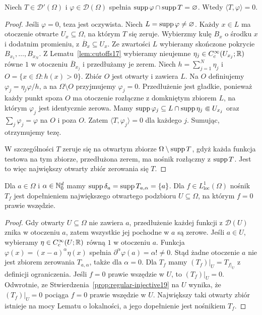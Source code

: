 \begin{lemat}
\label{lem:distribution-local19}
Niech $T\in\mathcal D'(\Omega)$ i
$\varphi\in\mathcal D(\Omega)$ spełnia
$\operatorname{supp}\varphi\cap\operatorname{supp} T=\varnothing$. Wtedy
$\langle T,\varphi\rangle=0$.
\end{lemat}
\begin{proof}
Jeśli $\varphi=0$, teza jest oczywista.
Niech $L=\operatorname{supp}\varphi\ne\varnothing$.
Każdy $x\in L$ ma otoczenie otwarte $U_x\subseteq\Omega$,
na którym $T$ się zeruje. Wybierzmy kulę $B_x$
o środku $x$ i dodatnim promieniu, z $\overline B_x\subseteq U_x$.
Ze zwartości $L$ wybieramy skończone pokrycie
$B_{x_1},\ldots,B_{x_N}$.
Z Lematu~\ref{lem:cutoffs17} wybieramy nieujemne
$\eta_j\in C_c^\infty(U_{x_j};\mathbb R)$ równe $1$
w otoczeniu $\overline B_{x_j}$ i przedłużamy je zerem.
Niech $h=\sum_{j=1}^N\eta_j$ i $O=\{x\in\Omega:h(x)>0\}$.
Zbiór $O$ jest otwarty i zawiera $L$.
Na $O$ definiujemy $\varphi_j=\eta_j\varphi/h$,
a na $\Omega\setminus O$ przyjmujemy $\varphi_j=0$.
Przedłużenie jest gładkie, ponieważ każdy punkt spoza $O$
ma otoczenie rozłączne z domkniętym zbiorem $L$,
na którym $\varphi_j$ jest identycznie zerowa.
Mamy $\operatorname{supp}\varphi_j\subseteq L\cap\operatorname{supp}\eta_j\Subset U_{x_j}$
oraz $\sum_j\varphi_j=\varphi$ na $O$ i poza $O$.
Zatem $\langle T,\varphi_j\rangle=0$ dla każdego $j$.
Sumując, otrzymujemy tezę.

W szczególności $T$ zeruje się na otwartym zbiorze
$\Omega\setminus\operatorname{supp} T$, gdyż każda funkcja testowa
na tym zbiorze, przedłużona zerem, ma nośnik rozłączny
z $\operatorname{supp} T$. Jest to więc największy otwarty zbiór
zerowania się $T$.
\end{proof}

\begin{stwierdzenie}
\label{prop:support-examples19}
Dla $a\in\Omega$ i $\alpha\in\mathbb N_0^d$ mamy
$\operatorname{supp}\delta_a=\operatorname{supp} T_{a,\alpha}=\{a\}$.
Dla $f\in L^1_{\mathrm{loc}}(\Omega)$ nośnik $T_f$
jest dopełnieniem największego otwartego podzbioru
$U\subseteq\Omega$, na którym $f=0$ prawie wszędzie.
\end{stwierdzenie}
\begin{proof}
Gdy otwarty $U\subseteq\Omega$ nie zawiera $a$,
przedłużenie każdej funkcji z $\mathcal D(U)$ znika
w otoczeniu $a$, zatem wszystkie jej pochodne w $a$ są zerowe.
Jeśli $a\in U$, wybieramy $\eta\in C_c^\infty(U;\mathbb R)$
równą $1$ w otoczeniu $a$. Funkcja
$\varphi(x)=(x-a)^\alpha\eta(x)$ spełnia
$\partial^\alpha\varphi(a)=\alpha!\ne0$.
Stąd żadne otoczenie $a$ nie jest zbiorem zerowania
$T_{a,\alpha}$, także dla $\alpha=0$.
Dla $T_f$ mamy $(T_f)|_U=T_{f|_U}$ z definicji ograniczenia.
Jeśli $f=0$ prawie wszędzie w $U$, to $(T_f)|_U=0$.
Odwrotnie, ze Stwierdzenia~\ref{prop:regular-injective19}
na $U$ wynika, że $(T_f)|_U=0$ pociąga $f=0$ prawie wszędzie w $U$.
Największy taki otwarty zbiór istnieje na mocy Lematu
o lokalności, a jego dopełnienie jest nośnikiem $T_f$.
\end{proof}

